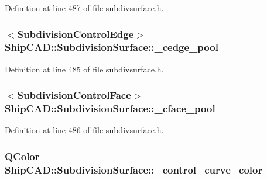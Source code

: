 Definition at line 487 of file subdivsurface.\+h.

\subsubsection[{\texorpdfstring{\+\_\+cedge\+\_\+pool}{_cedge_pool}}]{$<${\bf Subdivision\+Control\+Edge}$>$ Ship\+C\+A\+D\+::\+Subdivision\+Surface\+::\+\_\+cedge\+\_\+pool\hspace{0.3cm}{\ttfamily [protected]}}\hypertarget{classShipCAD_1_1SubdivisionSurface_ad6607443a90f57a3d67a8c6b92c0a46f}{}\label{classShipCAD_1_1SubdivisionSurface_ad6607443a90f57a3d67a8c6b92c0a46f}


Definition at line 485 of file subdivsurface.\+h.

\subsubsection[{\texorpdfstring{\+\_\+cface\+\_\+pool}{_cface_pool}}]{$<${\bf Subdivision\+Control\+Face}$>$ Ship\+C\+A\+D\+::\+Subdivision\+Surface\+::\+\_\+cface\+\_\+pool\hspace{0.3cm}{\ttfamily [protected]}}\hypertarget{classShipCAD_1_1SubdivisionSurface_abdb812e2df0e8f1c80242e7e4f5d709b}{}\label{classShipCAD_1_1SubdivisionSurface_abdb812e2df0e8f1c80242e7e4f5d709b}


Definition at line 486 of file subdivsurface.\+h.

\subsubsection[{\texorpdfstring{\+\_\+control\+\_\+curve\+\_\+color}{_control_curve_color}}]{\setlength{\rightskip}{0pt plus 5cm}Q\+Color Ship\+C\+A\+D\+::\+Subdivision\+Surface\+::\+\_\+control\+\_\+curve\+\_\+color\hspace{0.3cm}{\ttfamily [protected]}}\hypertarget{classShipCAD_1_1SubdivisionSurface_af0385bc183e805c1adc23750747a43d7}{}\label{classShipCAD_1_1SubdivisionSurface_af0385bc183e805c1adc23750747a43d7}


